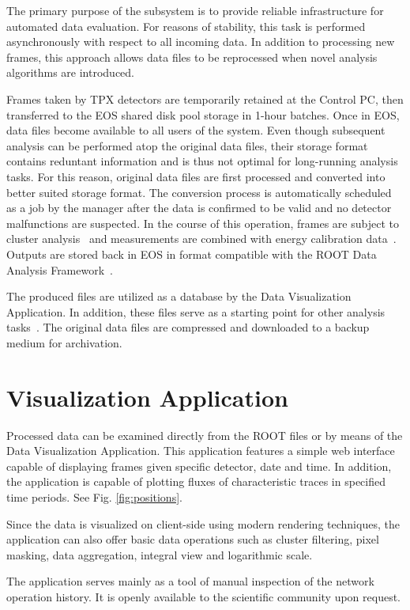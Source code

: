 \documentclass[journal]{IEEEtran}
\begin{document}
The primary purpose of the subsystem is to provide reliable infrastructure for automated data evaluation. For reasons of stability, this task is performed asynchronously with respect to all incoming data. In addition to processing new frames, this approach allows data files to be reprocessed when novel analysis algorithms are introduced.

Frames taken by TPX detectors are temporarily retained at the Control PC, then transferred to the EOS shared disk pool storage in 1-hour batches. Once in EOS, data files become available to all users of the system. Even though subsequent analysis can be performed atop the original data files, their storage format contains reduntant information and is thus not optimal for long-running analysis tasks. For this reason, original data files are first processed and converted into better suited storage format. The conversion process is automatically scheduled as a job by the manager after the data is confirmed to be valid and no detector malfunctions are suspected. In the course of this operation, frames are subject to cluster analysis~\cite{Holy2008} and measurements are combined with energy calibration data~\cite{Jakubek2011}. Outputs are stored back in EOS in format compatible with the ROOT Data Analysis Framework~\cite{ROOT}.

The produced files are utilized as a database by the Data Visualization Application. In addition, these files serve as a starting point for other analysis tasks~\cite{Sopczak2017}. The original data files are compressed and downloaded to a backup medium for archivation.

\section{\label{sec:dal}Visualization Application}
Processed data can be examined directly from the ROOT files or by means of the Data Visualization Application. \cite{Manek2016} This application features a simple web interface capable of displaying frames given specific detector, date and time. In addition, the application is capable of plotting fluxes of characteristic traces in specified time periods. See Fig. \ref{fig:positions}.

Since the data is visualized on client-side using modern rendering techniques, the application can also offer basic data operations such as cluster filtering, pixel masking, data aggregation, integral view and logarithmic scale.

The application serves mainly as a tool of manual inspection of the network operation history. It is openly available to the scientific community upon request.
\end{document}
